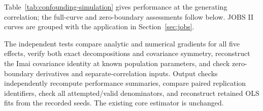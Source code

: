 Table~\ref{tab:confounding-simulation} gives performance at the generating correlation; the full-curve and zero-boundary assessments follow below. JOBS II curves are grouped with the application in Section~\ref{sec:jobs}.



The independent tests compare analytic and numerical gradients for all five effects, verify both exact decompositions and covariance symmetry, reconstruct the Imai covariance identity at known population parameters, and check zero-boundary derivatives and separate-correlation inputs. Output checks independently recompute performance summaries, compare paired replication identifiers, check all attempted/valid denominators, and reconstruct retained OLS fits from the recorded seeds. The existing core estimator is unchanged.


